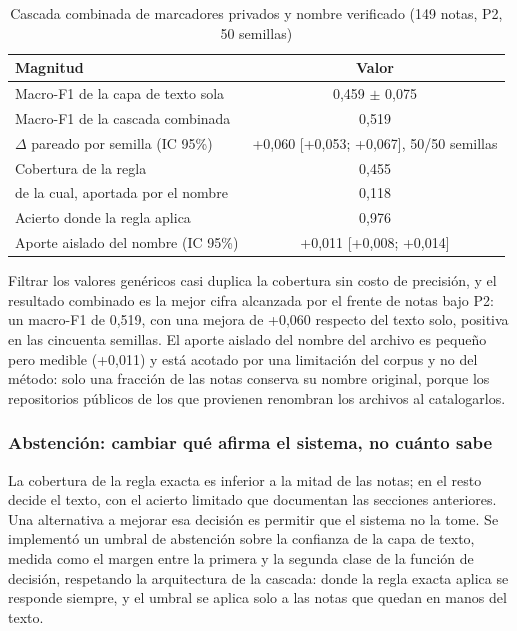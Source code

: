 \begin{table}[ht]
\centering
\caption{Cascada combinada de marcadores privados y nombre verificado (149 notas, P2, 50 semillas)}
\label{tab:cascada_combinada}
\begin{tabular}{|l|c|}
\hline
\textbf{Magnitud} & \textbf{Valor} \\
\hline
Macro-F1 de la capa de texto sola & 0,459 $\pm$ 0,075 \\
Macro-F1 de la cascada combinada & 0,519 \\
$\Delta$ pareado por semilla (IC 95\%) & +0,060 [+0,053; +0,067], 50/50 semillas \\
Cobertura de la regla & 0,455 \\
\quad de la cual, aportada por el nombre & 0,118 \\
Acierto donde la regla aplica & 0,976 \\
Aporte aislado del nombre (IC 95\%) & +0,011 [+0,008; +0,014] \\
\hline
\end{tabular}
\end{table}

Filtrar los valores genéricos casi duplica la cobertura sin costo de precisión, y el resultado combinado es la mejor cifra alcanzada por el frente de notas bajo P2: un macro-F1 de 0,519, con una mejora de +0,060 respecto del texto solo, positiva en las cincuenta semillas. El aporte aislado del nombre del archivo es pequeño pero medible (+0,011) y está acotado por una limitación del corpus y no del método: solo una fracción de las notas conserva su nombre original, porque los repositorios públicos de los que provienen renombran los archivos al catalogarlos.

\subsubsection*{Abstención: cambiar qué afirma el sistema, no cuánto sabe}

La cobertura de la regla exacta es inferior a la mitad de las notas; en el resto decide el texto, con el acierto limitado que documentan las secciones anteriores. Una alternativa a mejorar esa decisión es permitir que el sistema no la tome. Se implementó un umbral de abstención sobre la confianza de la capa de texto, medida como el margen entre la primera y la segunda clase de la función de decisión, respetando la arquitectura de la cascada: donde la regla exacta aplica se responde siempre, y el umbral se aplica solo a las notas que quedan en manos del texto.

